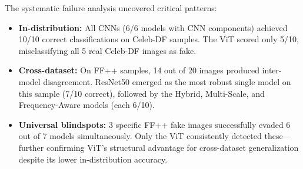 \documentclass[runningheads]{llncs}
\begin{document}
The systematic failure analysis uncovered critical patterns:
\begin{itemize}
    \item \textbf{In-distribution:} All CNNs (6/6 models with CNN components) achieved 10/10 correct classifications on Celeb-DF samples. The ViT scored only 5/10, misclassifying all 5 real Celeb-DF images as fake.
    \item \textbf{Cross-dataset:} On FF++ samples, 14 out of 20 images produced inter-model disagreement. ResNet50 emerged as the most robust single model on this sample (7/10 correct), followed by the Hybrid, Multi-Scale, and Frequency-Aware models (each 6/10).
    \item \textbf{Universal blindspots:} 3 specific FF++ fake images successfully evaded 6 out of 7 models simultaneously. Only the ViT consistently detected these---further confirming ViT's structural advantage for cross-dataset generalization despite its lower in-distribution accuracy.
\end{itemize}
\end{document}
